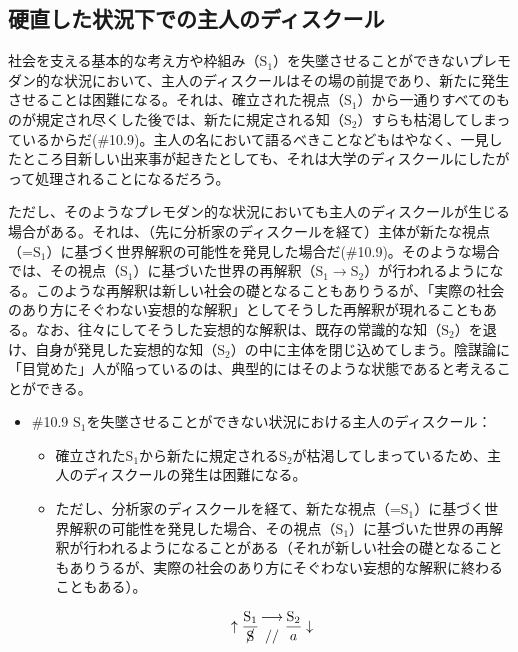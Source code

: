 \subsection{硬直した状況下での主人のディスクール}\label{ux786cux76f4ux3057ux305fux72b6ux6cc1ux4e0bux3067ux306eux4e3bux4ebaux306eux30c7ux30a3ux30b9ux30afux30fcux30eb}

社会を支える基本的な考え方や枠組み（\(\textrm{S}_1\)）を失墜させることができないプレモダン的な状況において、主人のディスクールはその場の前提であり、新たに発生させることは困難になる。それは、確立された視点（\(\textrm{S}_1\)）から一通りすべてのものが規定され尽くした後では、新たに規定される知（\(\textrm{S}_2\)）すらも枯渇してしまっているからだ(\#10.9)。主人の名において語るべきことなどもはやなく、一見したところ目新しい出来事が起きたとしても、それは大学のディスクールにしたがって処理されることになるだろう。

ただし、そのようなプレモダン的な状況においても主人のディスクールが生じる場合がある。それは、（先に分析家のディスクールを経て）主体が新たな視点（=\(\textrm{S}_1\)）に基づく世界解釈の可能性を発見した場合だ(\#10.9)。そのような場合では、その視点（\(\textrm{S}_1\)）に基づいた世界の再解釈（\(\textrm{S}_1\rightarrow\textrm{S}_2\)）が行われるようになる。このような再解釈は新しい社会の礎となることもありうるが、「実際の社会のあり方にそぐわない妄想的な解釈」としてそうした再解釈が現れることもある。なお、往々にしてそうした妄想的な解釈は、既存の常識的な知（\(\textrm{S}_2\)）を退け、自身が発見した妄想的な知（\(\textrm{S}_2\)）の中に主体を閉じ込めてしまう。陰謀論に「目覚めた」人が陥っているのは、典型的にはそのような状態であると考えることができる。

\begin{note}{}
  \begin{itemize}
    \tightlist
    \item{\#10.9} $\textrm{S}_1$を失墜させることができない状況における主人のディスクール：
      \begin{itemize}
        \tightlist
        \item 確立された$\textrm{S}_1$から新たに規定される$\textrm{S}_2$が枯渇してしまっているため、主人のディスクールの発生は困難になる。
        \item ただし、分析家のディスクールを経て、新たな視点（=$\textrm{S}_1$）に基づく世界解釈の可能性を発見した場合、その視点（$\textrm{S}_1$）に基づいた世界の再解釈が行われるようになることがある（それが新しい社会の礎となることもありうるが、実際の社会のあり方にそぐわない妄想的な解釈に終わることもある）。
      \end{itemize}

$$
\uparrow\frac{\mathrm{S_1}}{\cancel{\textrm{S}}}\genfrac{}{}{0pt}{}{\longrightarrow}{//}\frac{\mathrm{S_2}}{a}\downarrow
$$
  \end{itemize}
\end{note}


